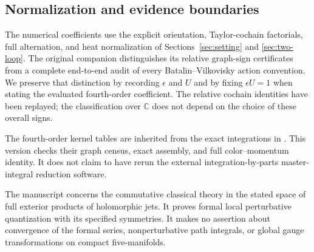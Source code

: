 \subsection{Normalization and evidence boundaries}

The numerical coefficients use the explicit orientation,
Taylor-cochain factorials, full alternation, and heat
normalization of Sections~\ref{sec:setting} and
\ref{sec:two-loop}. The original companion distinguishes
its relative graph-sign certificates from a complete
end-to-end audit of every Batalin--Vilkovisky action
convention. We preserve that distinction by recording
$\epsilon$ and $U$ and by fixing $\epsilon U=1$ when
stating the evaluated fourth-order coefficient.
The relative cochain identities have been replayed;
the classification over $\mathbb C$ does not depend on
the choice of these overall signs.

The fourth-order kernel tables are inherited from
the exact integrations in \cite{RepoHigher}. This
version checks their graph census, exact assembly,
and full color--momentum identity. It does not claim
to have rerun the external integration-by-parts
master-integral reduction software.

The manuscript concerns the commutative classical
theory in the stated space of full exterior products
of holomorphic jets. It proves formal local
perturbative quantization with its specified
symmetries. It makes no assertion about convergence
of the formal series, nonperturbative path
integrals, or global gauge transformations on
compact five-manifolds.
